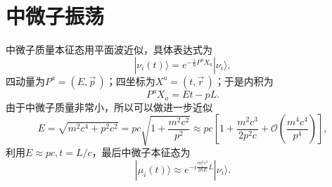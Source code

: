 

\usepackage{ctex}

	\chapter{中微子振荡}	
			\begin{GCBox}[title = 平面波本征态]{}
				中微子质量本征态用平面波近似，具体表达式为
					\begin{equation}
						|\nu_i(t)\rangle
						= e^{-\frac{i}{\hbar}P^aX_a}|\nu_i\rangle,
					\end{equation}
				四动量为$P^a = (E, \vec{p}\,)$；四坐标为$X^a = (t, \vec{r} \,)$；于是内积为
					\begin{equation}
						P^aX_a
						= Et - pL.
					\end{equation}
				由于中微子质量非常小，所以可以做进一步近似
					\begin{equation}
						E
						= \sqrt{m^2c^4 + p^2c^2}
						= pc\sqrt{1 + \frac{m^2c^2}{p^2}}
						\approx pc\left[1 + \frac{m^2c^3}{2p^2c} + \mathcal{O}\left(\frac{m^4c^4}{p^4}\right)\right],
					\end{equation}
				利用$E\approx pc, t = L/c$，最后中微子本征态为
					\begin{equation}
						|\mu_i(t)\rangle 
						\approx e^{-i\frac{m^2_ic^3}{2\hbar E}L}|\nu_i\rangle.
					\end{equation}
			\end{GCBox}		
